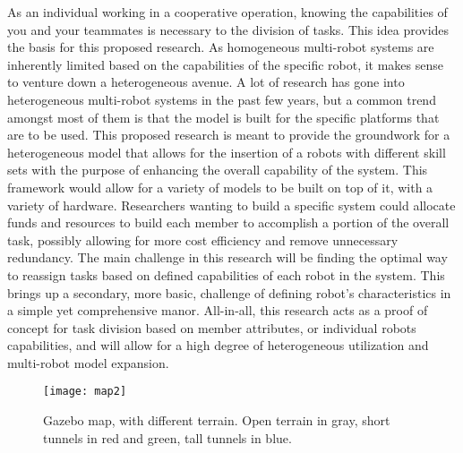 As an individual working in a cooperative operation, knowing the capabilities
of you and your teammates is necessary to the division of tasks. This idea
provides the basis for this proposed research. As homogeneous multi-robot systems
are inherently limited based on the capabilities of the specific robot,
it makes sense to venture down a heterogeneous avenue. A lot of research
has gone into heterogeneous multi-robot systems in the past few years, but a
common trend amongst most of them is that the model is built for the specific
platforms that are to be used. This proposed research is meant to provide the
groundwork for a heterogeneous model that allows for the insertion of a
robots with different skill sets with the purpose of enhancing the overall
capability of the system. This framework would allow for a variety of models
to be built on top of it, with a variety of hardware. Researchers wanting to
build a specific system could allocate funds and resources to build each member
to accomplish a portion of the overall task, possibly allowing for more cost
efficiency and remove unnecessary redundancy. The main challenge in this
research will be finding the optimal way to reassign tasks based on defined
capabilities of each robot in the system. This brings up a secondary, more basic,
challenge of defining robot’s characteristics in a simple yet comprehensive manor.
All-in-all, this research acts as a proof of concept for task division based on member
attributes, or individual robots capabilities, and will allow for a high degree of
heterogeneous utilization and multi-robot model expansion.

\begin{figure}[H]
  \centering
    \texttt{[image: map2]}
  \caption{Gazebo map, with different terrain. Open terrain in gray, short tunnels in red and green, tall tunnels in blue.}
  \label{fig:map}
\end{figure}



